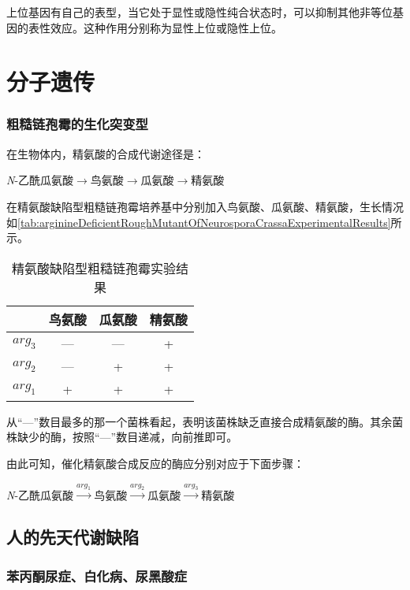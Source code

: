 上位基因有自己的表型，当它处于显性或隐性纯合状态时，可以抑制其他非等位基因的表性效应。这种作用分别称为显性上位或隐性上位。

\section{分子遗传}

\subsubsection{粗糙链孢霉的生化突变型}

在生物体内，精氨酸的合成代谢途径是：
\begin{center}
	\textit{N}-乙酰瓜氨酸$\longrightarrow$鸟氨酸$\longrightarrow$瓜氨酸$\longrightarrow$精氨酸
\end{center}

在精氨酸缺陷型粗糙链孢霉培养基中分别加入鸟氨酸、瓜氨酸、精氨酸，生长情况如\autoref{tab:arginineDeficientRoughMutantOfNeurosporaCrassaExperimentalResults}所示。

\begin{table}[htbp]
	\centering
	\begin{tabularx}{\textwidth}{|c|C|C|C|}
		\hline
		& 鸟氨酸 & 瓜氨酸 & 精氨酸 \\ \hline
		$arg_3$ & --- & --- & + \\ \hline
		$arg_2$ & --- & + & + \\ \hline
		$arg_1$ & + & + & + \\ \hline
	\end{tabularx}
	\caption{精氨酸缺陷型粗糙链孢霉实验结果}
	\label{tab:arginineDeficientRoughMutantOfNeurosporaCrassaExperimentalResults}
\end{table}

从“---”数目最多的那一个菌株看起，表明该菌株缺乏直接合成精氨酸的酶。其余菌株缺少的酶，按照“---”数目递减，向前推即可。

由此可知，催化精氨酸合成反应的酶应分别对应于下面步骤：
\begin{center}
	\textit{N}-乙酰瓜氨酸$\xrightarrow{arg_1}$鸟氨酸$\xrightarrow{arg_2}$瓜氨酸$\xrightarrow{arg_3}$精氨酸
\end{center}

\subsection{人的先天代谢缺陷}

\subsubsection{苯丙酮尿症、白化病、尿黑酸症}

